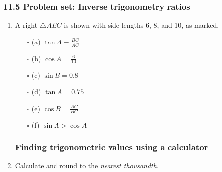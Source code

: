 \documentclass[12pt, twoside]{article}
\begin{document}
\subsubsection*{11.5 Problem set: Inverse trigonometry ratios}

\begin{enumerate}


\subsubsection*{Identify each true statement}

  \item A right $\triangle ABC$ is shown with side lengths 6, 8, and 10, as marked. %
  \begin{multicols}{2}
    \begin{enumerate}[itemsep=0.4cm]
      \item[$\square$ (a)] $\displaystyle \tan A=\frac{BC}{AC}$
      \item[$\square$ (b)] $\displaystyle \cos A=\frac{6}{10}$
      \item[$\square$ (c)] $\displaystyle \sin B= 0.8$
      \item[$\square$ (d)] $\displaystyle \tan A= 0.75$
      \item[$\square$ (e)] $\displaystyle \cos B=\frac{AC}{BC}$
      \item[$\square$ (f)] $\sin A > \cos A$
      \end{enumerate}
    \end{multicols} \vspace{0.5cm}

  \subsubsection*{Finding trigonometric values using a calculator}

  \item Calculate and round to the \emph{nearest thousandth}.
  \begin{enumerate}
    \end{enumerate} \vspace{1.cm}


\end{enumerate}
\end{document}
